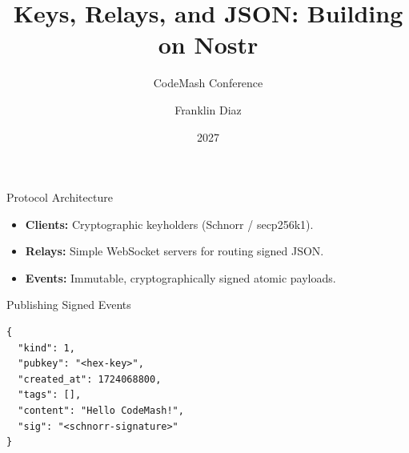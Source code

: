 \documentclass[aspectratio=169]{beamer}
\title{Keys, Relays, and JSON: Building on Nostr}
\subtitle{CodeMash Conference}
\author{Franklin Diaz}
\date{2027}
\begin{document}
\frame{\titlepage}

\begin{frame}{Protocol Architecture}
  \begin{itemize}
    \item \textbf{Clients:} Cryptographic keyholders (Schnorr / secp256k1).
    \item \textbf{Relays:} Simple WebSocket servers for routing signed JSON.
    \item \textbf{Events:} Immutable, cryptographically signed atomic payloads.
  \end{itemize}
\end{frame}

\begin{frame}[fragile]{Publishing Signed Events}
\begin{lstlisting}
{
  "kind": 1,
  "pubkey": "<hex-key>",
  "created_at": 1724068800,
  "tags": [],
  "content": "Hello CodeMash!",
  "sig": "<schnorr-signature>"
}
\end{lstlisting}
\end{frame}
\end{document}
